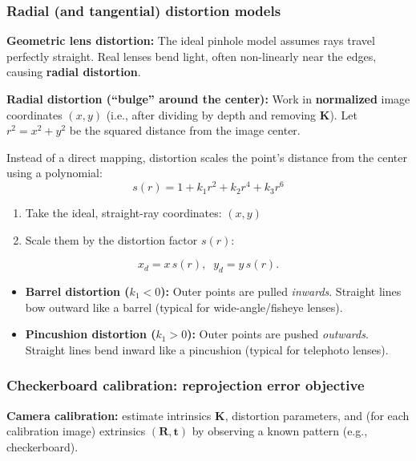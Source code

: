 \documentclass[11pt,a4paper]{article}
\newcommand{\vct}[1]{\bm{#1}}
\newcommand{\mat}[1]{\mathbf{#1}}
\begin{document}
\subsubsection{Radial (and tangential) distortion models}

\begin{defbox}
\textbf{Geometric lens distortion:} The ideal pinhole model assumes rays travel perfectly straight. Real lenses bend light, often non-linearly near the edges, causing \textbf{radial distortion}.
\end{defbox}

\begin{mathrule}
\textbf{Radial distortion (``bulge'' around the center):}\;
Work in \textbf{normalized} image coordinates $(x,y)$ (i.e., after dividing by depth and removing $\mat{K}$).
Let $r^2 = x^2 + y^2$ be the squared distance from the image center.

Instead of a direct mapping, distortion scales the point's distance from the center using a polynomial:
\[
s(r)= 1 + k_1 r^2 + k_2 r^4 + k_3 r^6
\]
\begin{enumerate}
  \item Take the ideal, straight-ray coordinates: $(x, y)$
  \item Scale them by the distortion factor $s(r)$:
\end{enumerate}
\[
x_d = x\,s(r),\;\; y_d = y\,s(r).
\]
\end{mathrule}

\begin{itemize}
  \item \textbf{Barrel distortion ($k_1 < 0$):} Outer points are pulled \emph{inwards}. Straight lines bow outward like a barrel (typical for wide-angle/fisheye lenses).
  \item \textbf{Pincushion distortion ($k_1 > 0$):} Outer points are pushed \emph{outwards}. Straight lines bend inward like a pincushion (typical for telephoto lenses).
\end{itemize}

\subsubsection{Checkerboard calibration: reprojection error objective}

\begin{defbox}
\textbf{Camera calibration:} estimate intrinsics $\mat{K}$, distortion parameters, and (for each calibration image)
extrinsics $(\mat{R},\vct{t})$ by observing a known pattern (e.g., checkerboard).
\end{defbox}
\end{document}
